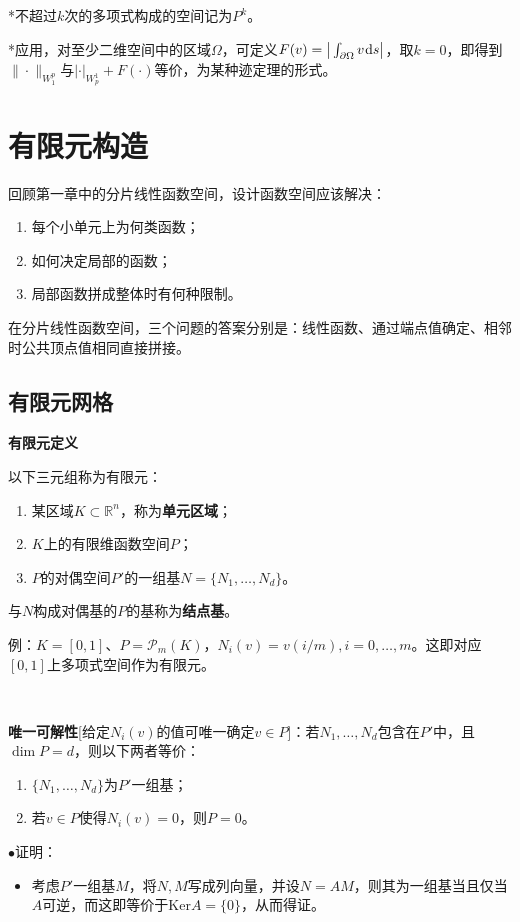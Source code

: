 \documentclass[a4paper,UTF8,fontset=windows]{ctexart}
\newcommand*{\dr}{\hspace{0.07em}\mathrm{d}}
\newcommand*{\cp}{\mathcal{P}}
\newcommand{\proo}[1]{{\kaishu $\bullet$证明：
\begin{itemize}
    \item[] #1
\end{itemize}
}}
\begin{document}
*不超过$k$次的多项式构成的空间记为$P^k$。

*应用，对至少二维空间中的区域$\Omega$，可定义$F(v)=\big|\int_{\partial\Omega}v\dr s\big|$，取$k=0$，即得到$\|\cdot\|_{W_1^p}$与$|\cdot|_{W_p^1}+F(\cdot)$等价，为某种迹定理的形式。

\section{有限元构造}
回顾第一章中的分片线性函数空间，设计函数空间应该解决：
\begin{enumerate}
    \item 每个小单元上为何类函数；
    \item 如何决定局部的函数；
    \item 局部函数拼成整体时有何种限制。
\end{enumerate}

在分片线性函数空间，三个问题的答案分别是：线性函数、通过端点值确定、相邻时公共顶点值相同直接拼接。

\subsection{有限元网格}
\textbf{有限元定义}

以下三元组称为有限元：
\begin{enumerate}
    \item 某区域$K\subset\mathbb{R}^n$，称为\textbf{单元区域}；
    \item $K$上的有限维函数空间$P$；
    \item $P$的对偶空间$P'$的一组基$N=\{N_1,\dots,N_d\}$。
\end{enumerate}

与$N$构成对偶基的$P$的基称为\textbf{结点基}。

例：$K=[0,1]$、$P=\cp_m(K)$，$N_i(v)=v(i/m),i=0,\dots,m$。这即对应$[0,1]$上多项式空间作为有限元。

\

\textbf{唯一可解性}[给定$N_i(v)$的值可唯一确定$v\in P$]：若$N_1,\dots,N_d$包含在$P'$中，且$\dim P=d$，则以下两者等价：
\begin{enumerate}
    \item $\{N_1,\dots,N_d\}$为$P'$一组基；
    \item 若$v\in P$使得$N_i(v)=0$，则$P=0$。
\end{enumerate}

\proo{
    考虑$P'$一组基$M$，将$N,M$写成列向量，并设$N=AM$，则其为一组基当且仅当$A$可逆，而这即等价于$\mathrm{Ker} A=\{0\}$，从而得证。
}
\end{document}
